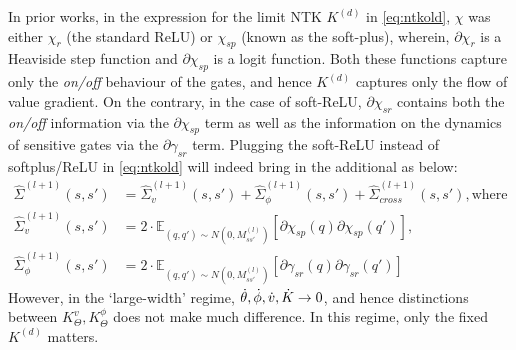 In prior works, in the expression for the limit NTK $K^{(d)}$ in \eqref{eq:ntkold}, $\chi$ was either $\chi_r$ (the standard ReLU) or $\chi_{sp}$ (known as the soft-plus), wherein, $\partial{\chi}_r$ is a Heaviside step function and $\partial{\chi}_{sp}$ is a logit function. Both these functions capture only the \emph{on/off} behaviour of the gates, and hence $K^{(d)}$ captures only the flow of value gradient. On the contrary, in the case of soft-ReLU, $\partial{\chi}_{sr}$ contains both the \emph{on/off} information via the $\partial{\chi}_{sp}$ term as well as the information on the dynamics of sensitive gates via the $\partial{\gamma}_{sr}$ term. Plugging the soft-ReLU instead of softplus/ReLU in \eqref{eq:ntkold} will indeed bring in the additional as below:
\begin{align*}
\hat{\Sigma}^{(l+1)}(s,s')&=\hat{\Sigma}^{(l+1)}_v(s,s')+ \hat{\Sigma}^{(l+1)}_{\phi}(s,s') + \hat{\Sigma}^{(l+1)}_{cross}(s,s'),\text{where}\\
\hat{\Sigma}^{(l+1)}_v(s,s')&=2\cdot\mathbb{E}_{(q,q')\sim N(0,M_{ss'}^{(l)})}\left[\partial{\chi}_{sp}(q)\partial{\chi}_{sp}(q')\right],\\
\hat{\Sigma}^{(l+1)}_{\phi}(s,s')&=2\cdot\mathbb{E}_{(q,q')\sim N(0,M_{ss'}^{(l)})}\left[\partial{\gamma}_{sr}(q)\partial{\gamma}_{sr}(q')\right]
\end{align*}
However, in the `large-width' regime, $\dot{\theta},\dot{\phi},\dot{v},\dot{K}\rightarrow 0$, and hence distinctions between $K^{v}_{\Theta}, K^{\phi}_{\Theta}$ does not make much difference. In this regime, only the fixed $K^{(d)}$ matters.
